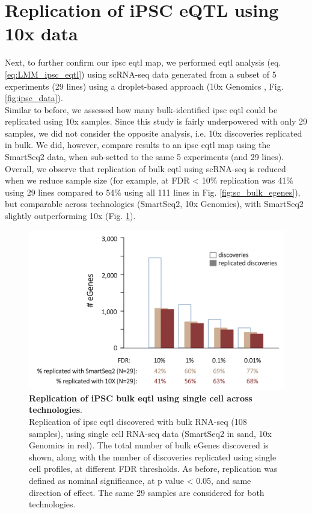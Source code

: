 \newpage

\section{Replication of iPSC eQTL using 10x data}

Next, to further confirm our \gls{ipsc} \gls{eqtl} map, we performed \gls{eqtl} analysis (eq. \eqref{eq:LMM_ipsc_eqtl}) using scRNA-seq data generated from a subset of 5 experiments (29 lines) using a droplet-based approach (10x Genomics \cite{zheng2017massively}, Fig. \ref{fig:ipsc_data}).\\

Similar to before, we assessed how many bulk-identified \gls{ipsc} \gls{eqtl} could be replicated using 10x samples.
Since this study is fairly underpowered with only 29 samples, we did not consider the opposite analysis, i.e. 10x discoveries replicated in bulk.
We did, however, compare results to an \gls{ipsc} \gls{eqtl} map using the SmartSeq2 data, when sub-setted to the same 5 experiments (and 29 lines). \\

Overall, we observe that replication of bulk \gls{eqtl} using scRNA-seq is reduced when we reduce sample size (for example, at FDR < 10\% replication was 41\% using 29 lines compared to 54\% using all 111 lines in Fig. \ref{fig:sc_bulk_egenes}), but comparable across technologies (SmartSeq2, 10x Genomics), with SmartSeq2 slightly outperforming 10x (Fig. \ref{fig:sc_bulk_10x_egenes}).

\begin{figure}[h]
\includegraphics[width=14.5cm]{Chapter3/Fig/sc_vs_bulk_vs_10x.png}
\caption[iPSC bulk eQTL replication]{\textbf{Replication of iPSC bulk \gls{eqtl} using single cell across technologies}.\\
Replication of \gls{ipsc} \gls{eqtl} discovered with bulk RNA-seq (108 samples), using single cell RNA-seq data (SmartSeq2 in sand, 10x Genomics in red). 
The total number of bulk eGenes discovered is shown, along with the number of discoveries replicated using single cell profiles, at different FDR thresholds. 
As before, replication was defined as nominal significance, at p value < 0.05, and same direction of effect. 
The same 29 samples are considered for both technologies.}
\label{fig:sc_bulk_10x_egenes}
\end{figure}

